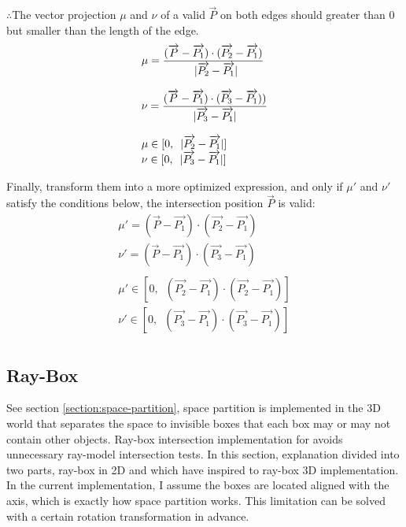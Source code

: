 $\therefore$\;\;\;\;The vector projection $\mu$ and $\nu$ of a valid $\overrightarrow{P}$ on both edges should greater than $0$ but smaller than the length of the edge.
\[
\begin{array}{lr}
\mu = \dfrac{(\overrightarrow{P} - \overrightarrow{P_1}) \cdot (\overrightarrow{P_2} - \overrightarrow{P_1})}{\enspace\lvert \overrightarrow{P_2} - \overrightarrow{P_1} \rvert}\\\\
\nu = \dfrac{(\overrightarrow{P} - \overrightarrow{P_1}) \cdot (\overrightarrow{P_3} - \overrightarrow{P_1}))}{\lvert \overrightarrow{P_3} - \overrightarrow{P_1} \rvert}\\\\
\mu \in [0,\enspace\lvert \overrightarrow{P_2} - \overrightarrow{P_1} \rvert]\\
\nu \in [0,\enspace\lvert \overrightarrow{P_3} - \overrightarrow{P_1} \rvert]\\
\end{array}
\]

Finally, transform them into a more optimized expression, and only if $\mu'$ and $\nu'$ satisfy the conditions below, the intersection position $\overrightarrow{P}$ is valid:
\[
\begin{array}{lr}
\mu' = (\overrightarrow{P} - \overrightarrow{P_1}) \cdot (\overrightarrow{P_2} - \overrightarrow{P_1})\\
\nu' = (\overrightarrow{P} - \overrightarrow{P_1}) \cdot (\overrightarrow{P_3} - \overrightarrow{P_1})\\\\
\mu' \in [0,\enspace (\overrightarrow{P_2} - \overrightarrow{P_1}) \cdot (\overrightarrow{P_2} - \overrightarrow{P_1})]\\
\nu' \in [0,\enspace (\overrightarrow{P_3} - \overrightarrow{P_1}) \cdot (\overrightarrow{P_3} - \overrightarrow{P_1})]\\
\end{array}
\]

\subsection{Ray-Box}
\label{section:ray-box}

See section \ref{section:space-partition}, space partition is implemented in the 3D world that separates the space to invisible boxes that each box may or may not contain other objects. Ray-box intersection implementation for avoids unnecessary ray-model intersection tests. In this section, explanation divided into two parts, ray-box in 2D and which have inspired to ray-box 3D implementation. In the current implementation, I assume the boxes are located aligned with the axis, which is exactly how space partition works. This limitation can be solved with a certain rotation transformation in advance.

